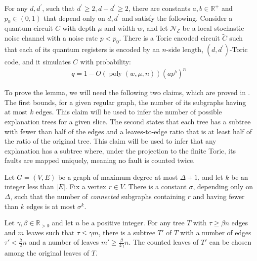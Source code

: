   \begin{lemma}
    \label{lemma:keylemma}
    For any $d, d^{\prime}$, such that $d^{\prime}\ge 2, d-d^{\prime} \ge 2$, there are constants $a, b \in \mathbb{R}^{+}$ and $p_{0} \in (0,1)$ that depend only on $d, d^{\prime}$ and satisfy the following. Consider a quantum circuit $C$ with depth $\mu$ and width $w$, and let $\mathcal{N}_{\mathcal{E}}$ be a local stochastic noise channel with a noise rate $p < p_{0}$. There is a Toric encoded circuit $\tilde{C}$ such that each of its quantum registers is encoded by an $n$-side length, $(d, d^{\prime})$-Toric code, and it simulates $C$ with probability:
\begin{equation*}
  \begin{split}
    q = 1 -   O \left( \operatorname{poly}(w,\mu,n) \right) \left( a p^{b} \right)^{n} 
  \end{split}
\end{equation*}
\end{lemma}


To prove the lemma, we will need the following two claims, which are proved in \cite{Berman, gacs2021newversiontoomsproof}. The first bounds, for a given regular graph, the number of its subgraphs having at most $k$ edges. This claim will be used to infer the number of possible explanation trees for a given slice. The second states that each tree has a subtree with fewer than half of the edges and a leaves-to-edge ratio that is at least half of the ratio of the original tree. This claim will be used to infer that any explanation has a subtree where, under the projection to the finite Toric, its faults are mapped uniquely, meaning no fault is counted twice. 

\begin{claim*}
  Let $G=(V,E)$ be a graph of maximum degree at most $\Delta+1$, and let $k$ be an integer less than $|E|$. Fix a vertex $r\in V$. There is a constant $\sigma$, depending only on $\Delta$, such that the number of \emph{connected} subgraphs containing $r$ and having fewer than $k$ edges is at most $\sigma^k$.
  \end{claim*}

  \begin{claim*}
  Let $\gamma,\beta\in\mathbb{R}_{>0}$ and let $n$ be a positive
  integer. For any tree $T$ with $\tau\ge\beta n$ edges and $m$ leaves
  such that $\tau\le\gamma m$, there is a subtree $T'$ of $T$ with a
  number of edges $\tau'<\frac{\beta}{2}n$ and a number of leaves
  $m'\ge\frac{\beta}{4\gamma}n$. The counted leaves of $T'$ can be
  chosen among the original leaves of $T$.
  \end{claim*}
  
